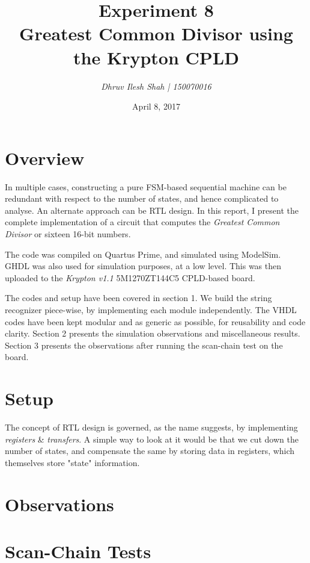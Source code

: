 \documentclass[a4paper, 11pt]{article}
\title{\bf Experiment 8\\\vspace*{2mm} Greatest Common Divisor using the Krypton CPLD}
\author{\it Dhruv Ilesh Shah | 150070016}
\date{April 8, 2017}
\begin{document}
\maketitle
\section*{Overview}
In multiple cases, constructing a pure FSM-based sequential machine can be redundant with respect to the number of states, and hence complicated to analyse. An alternate approach can be RTL design. In this report, I present the complete implementation of a circuit that computes the \emph{Greatest Common Divisor} or sixteen 16-bit numbers.

The code was compiled on Quartus Prime, and simulated using ModelSim. GHDL was also used for simulation purposes, at a low level. This was then uploaded to the {\em Krypton v1.1} 5M1270ZT144C5 CPLD-based board.

The codes and setup have been covered in section 1. We build the string recognizer piece-wise, by implementing each module independently. The VHDL codes have been kept modular and as generic as possible, for reusability and code clarity. Section 2 presents the simulation observations and miscellaneous results. Section 3 presents the observations after running the scan-chain test on the board.
\section{Setup}
The concept of RTL design is governed, as the name suggests, by implementing \emph{registers} \& \emph{transfers}. A simple way to look at it would be that we cut down the number of states, and compensate the same by storing data in registers, which themselves store "state" information.

\section{Observations}


\section{Scan-Chain Tests}
\end{document}
